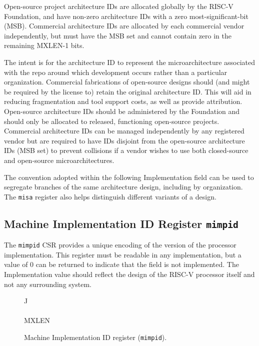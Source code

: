 Open-source project architecture IDs are allocated globally by the
RISC-V Foundation, and have non-zero architecture IDs with a zero
most-significant-bit (MSB).  Commercial architecture IDs are allocated
by each commercial vendor independently, but must have the MSB set and
cannot contain zero in the remaining MXLEN-1 bits.

\begin{commentary}
The intent is for the architecture ID to represent the
microarchitecture associated with the repo around which development
occurs rather than a particular organization.  Commercial fabrications
of open-source designs should (and might be required by the license
to) retain the original architecture ID.  This will aid in reducing
fragmentation and tool support costs, as well as provide attribution.
Open-source architecture IDs should be administered by the Foundation
and should only be allocated to released, functioning open-source
projects.  Commercial architecture IDs can be managed independently by
any registered vendor but are required to have IDs disjoint from the
open-source architecture IDs (MSB set) to prevent collisions if a
vendor wishes to use both closed-source and open-source
microarchitectures.

The convention adopted within the following Implementation field can
be used to segregate branches of the same architecture design,
including by organization.  The {\tt misa} register also helps
distinguish different variants of a design.
\end{commentary}

\subsection{Machine Implementation ID Register {\tt mimpid}}

The {\tt mimpid} CSR provides a unique encoding of the version of the
processor implementation.  This register must be readable in any
implementation, but a value of 0 can be returned to indicate that the
field is not implemented.  The Implementation value should reflect the
design of the RISC-V processor itself and not any surrounding system.

\begin{figure*}[h!]
{\footnotesize
\begin{center}
\begin{tabular}{J}
 \\
\hline
{}  \\
\hline
MXLEN \\
\end{tabular}
\end{center}
}
\vspace{-0.1in}
\caption{Machine Implementation ID register ({\tt mimpid}).}
\label{mimpidreg}
\end{figure*}

